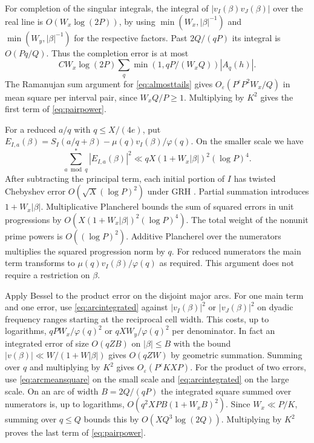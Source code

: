\documentclass[11pt,a4paper]{article}
\numberwithin{equation}{section}
\begin{document}
For completion of the singular integrals, the integral of
$|v_I(\beta)v_J(\beta)|$ over the real line is
$O(W_x\log(2P))$, by using $\min(W_x,|\beta|^{-1})$ and
$\min(W_y,|\beta|^{-1})$ for the respective factors.
Past $2Q/(qP)$ its integral is $O(Pq/Q)$.
Thus the completion error is at most
\[
 C W_x\log(2P)\sum_q \min(1,qP/(W_x Q))|A_q(h)|.
\]
The Ramanujan sum argument for \cref{eq:almosttails} gives
$O_\varepsilon(P^\varepsilon P^2 W_x/Q)$ in mean square per
interval pair, since $W_xQ/P\ge1$. Multiplying by $K^2$
gives the first term of \cref{eq:pairpower}.

For a reduced $a/q$ with $q\le X/(4e)$, put
$E_{I,a}(\beta)=S_I(a/q+\beta)-\mu(q)v_I(\beta)/\varphi(q)$.
On the smaller scale we have
\begin{equation}
  \sum_{a\bmod q}^{*}|E_{I,a}(\beta)|^2
       \ll qX(1+W_x|\beta|)^2(\log P)^4 .
  \label{eq:arcmeansquare}
\end{equation}
After subtracting the principal term, each initial portion
of $I$ has twisted Chebyshev error $O(\sqrt X(\log P)^2)$
under GRH \cite[Section~4]{LeeGRH}.
Partial summation introduces $1+W_x|\beta|$.
Multiplicative Plancherel bounds the sum of squared errors
in unit progressions by $O(X(1+W_x|\beta|)^2(\log P)^4)$.
The total weight of the nonunit prime powers is
$O((\log P)^2)$. Additive Plancherel over the numerators
multiplies the squared progression norm by $q$.
For reduced numerators the main term transforms to
$\mu(q)v_I(\beta)/\varphi(q)$ as required. This argument does
not require a restriction on $\beta$.

Apply Bessel to the product error on the disjoint major arcs.
For one main term and one error, use \cref{eq:arcintegrated}
against $|v_I(\beta)|^2$ or $|v_J(\beta)|^2$ on dyadic
frequency ranges starting at the reciprocal cell width.
This costs, up to logarithms, $qP W_x/\varphi(q)^2$ or
$qX W_y/\varphi(q)^2$ per denominator. In fact an integrated
error of size $O(qZB)$ on $|\beta|\le B$ with the bound
$|v(\beta)|\ll W/(1+W|\beta|)$ gives $O(qZW)$ by geometric
summation. Summing over $q$ and multiplying by $K^2$ gives
$O_\varepsilon(P^\varepsilon KXP)$.
For the product of two errors, use \cref{eq:arcmeansquare}
on the small scale and \cref{eq:arcintegrated} on the large
scale. On an arc of width $B=2Q/(qP)$ the integrated square
summed over numerators is, up to logarithms,
$O(q^2 XP B(1+W_x B)^2)$.
Since $W_x\ll P/K$, summing over $q\le Q$ bounds this
by $O(XQ^3\log(2Q))$. Multiplying by $K^2$ proves the last
term of \cref{eq:pairpower}.
\end{document}
